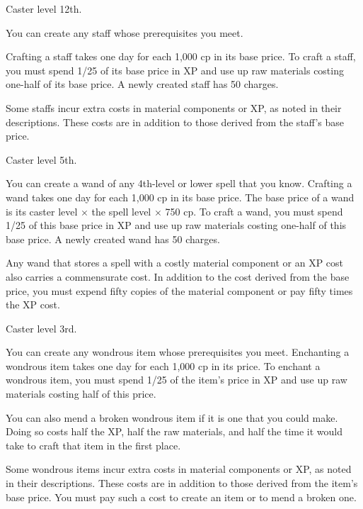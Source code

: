{Caster level 12th.}
{You can create any staff whose prerequisites you meet.

Crafting a staff takes one day for each 1,000 cp in its base price. To craft a staff, you must spend 1/25 of its base price in XP and use up raw materials costing one-half of its base price. A newly created staff has 50 charges.

Some staffs incur extra costs in material components or XP, as noted in their descriptions. These costs are in addition to those derived from the staff's base price.}




{Caster level 5th.}
{You can create a wand of any 4th-level or lower spell that you know. Crafting a wand takes one day for each 1,000 cp in its base price. The base price of a wand is its caster level $\times$ the spell level $\times$ 750 cp. To craft a wand, you must spend 1/25 of this base price in XP and use up raw materials costing one-half of this base price. A newly created wand has 50 charges.

Any wand that stores a spell with a costly material component or an XP cost also carries a commensurate cost. In addition to the cost derived from the base price, you must expend fifty copies of the material component or pay fifty times the XP cost.}

{Caster level 3rd.}
{You can create any wondrous item whose prerequisites you meet. Enchanting a wondrous item takes one day for each 1,000 cp in its price. To enchant a wondrous item, you must spend 1/25 of the item's price in XP and use up raw materials costing half of this price.

You can also mend a broken wondrous item if it is one that you could make. Doing so costs half the XP, half the raw materials, and half the time it would take to craft that item in the first place.

Some wondrous items incur extra costs in material components or XP, as noted in their descriptions. These costs are in addition to those derived from the item's base price. You must pay such a cost to create an item or to mend a broken one.}

